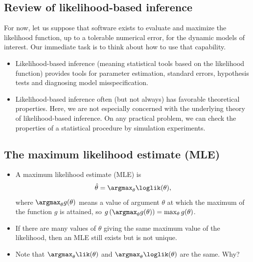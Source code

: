 \documentclass[
  letterpaper,
  DIV=11,
  numbers=noendperiod]{scrartcl}
\providecommand{\tightlist}{%
  \setlength{\itemsep}{0pt}\setlength{\parskip}{0pt}}\usepackage{longtable,booktabs,array}
\begin{document}
\hypertarget{review-of-likelihood-based-inference}{%
\subsection{Review of likelihood-based
inference}\label{review-of-likelihood-based-inference}}

For now, let us suppose that software exists to evaluate and maximize
the likelihood function, up to a tolerable numerical error, for the
dynamic models of interest. Our immediate task is to think about how to
use that capability.

\begin{itemize}
\tightlist
\item
  Likelihood-based inference (meaning statistical tools based on the
  likelihood function) provides tools for parameter estimation, standard
  errors, hypothesis tests and diagnosing model misspecification.
\item
  Likelihood-based inference often (but not always) has favorable
  theoretical properties. Here, we are not especially concerned with the
  underlying theory of likelihood-based inference. On any practical
  problem, we can check the properties of a statistical procedure by
  simulation experiments.
\end{itemize}

\hypertarget{the-maximum-likelihood-estimate-mle}{%
\subsection{The maximum likelihood estimate
(MLE)}\label{the-maximum-likelihood-estimate-mle}}

\begin{itemize}
\tightlist
\item
  A maximum likelihood estimate (MLE) is \begin{equation*}
   \hat\theta = \argmax_{\theta} \loglik(\theta),
      \end{equation*} where \(\argmax_{\theta} g(\theta)\) means a value
  of argument \(\theta\) at which the maximum of the function \(g\) is
  attained, so
  \(g\left(\argmax_{\theta} g(\theta)\right) = \max_\theta g(\theta)\).
\item
  If there are many values of \(\theta\) giving the same maximum value
  of the likelihood, then an MLE still exists but is not unique.
\item
  Note that \(\argmax_{\theta} \lik(\theta)\) and
  \(\argmax_{\theta} \loglik(\theta)\) are the same. Why?
\end{itemize}
\end{document}
